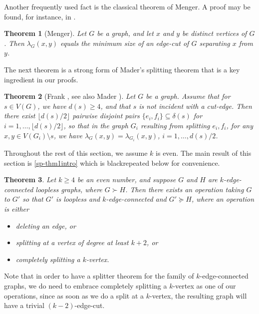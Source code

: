 \documentclass[letterpaper,11pt]{article}
\newtheorem{theorem}{Theorem}[section]
\theoremstyle{definition}
\newcommand{\col}{black}
\begin{document}
Another frequently used fact is the classical theorem of Menger. A proof may be found, for instance, in \cite{MR1367739}.


\begin{theorem}[Menger]
\label{Menger}
Let $G$ be a graph, and let $x$ and $y$ be distinct vertices of $G$. Then $\lambda_G(x,y)$ equals the minimum size of an edge-cut of $G$ separating $x$ from $y$.
\end{theorem}



The next theorem is a strong form of Mader's splitting theorem that is a key ingredient in our proofs.

	
	
\begin{theorem}[Frank \cite{MR1172364}, see also Mader \cite{MR499117}]
	\label{Mader}
	Let $G$ be a graph. Assume that for $s\in V(G)$, we have $d(s) \ge 4$, and that $s$ is not incident with a cut-edge. Then there exist $\lfloor d(s)/2 \rfloor $ pairwise disjoint pairs $\{e_i, f_i\} \subseteq \delta(s)$ for $i=1, \ldots, \lfloor d(s)/2 \rfloor$, so that in the graph $G_i$ resulting from splitting $e_i, f_i$,  for any $x,y\in V(G_i) \setminus s$, we have $\lambda_G(x,y)=\lambda_{G_i}(x,y)$, $i=1, \ldots, {d(s)}/{2}$.
\end{theorem}



Throughout the rest of this section, we assume $k$ is even. The main result of this section is \cref{sp-thm1intro} which is {\color \col{repeated}} below for convenience.

\begin{theorem}
\label{sp-thm1}
Let $k \ge 4$ be an even number, and suppose $G$ and $H$ are $k$-edge-connected loopless graphs, where $G\succ  H$. Then there exists an operation taking $G$ to $G'$ so that $G'$ is  loopless and $k$-edge-connected and $G'\succeq   H$, where an operation is either
\begin{itemize}
\item deleting an edge, or
\item splitting at a vertex of degree at least $k+2$, or
\item completely splitting a $k$-vertex.
\end{itemize}
\end{theorem}



Note that in order to have a splitter theorem for the family of $k$-edge-connected graphs, we do need to embrace completely splitting a $k$-vertex as one of our operations, since as soon as we do a split at a $k$-vertex, the resulting graph will have a trivial $(k - 2)$-edge-cut.
\end{document}
